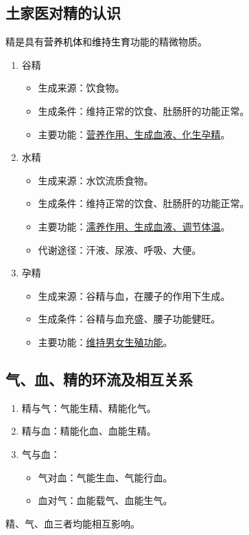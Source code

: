 \documentclass[cn,black,12pt,normal,founder]{elegantnote}
\newcommand{\redt}[1]{\textcolor{black}{{}#1}}      %
\begin{document}
\subsection{土家医对精的认识}

精是具有\redt{营养机体}和\redt{维持生育}功能的精微物质。

\begin{enumerate}
  \item 谷精
  \begin{itemize}
    \item 生成来源：饮食物。
    \item 生成条件：维持正常的饮食、肚肠肝的功能正常。
    \item 主要功能：\uline{营养作用、生成血液、化生孕精}。
  \end{itemize}
  \item 水精
  \begin{itemize}
    \item 生成来源：水饮流质食物。
    \item 生成条件：维持正常的饮食、肚肠肝的功能正常。
    \item 主要功能：\uline{濡养作用、生成血液、调节体温}。
    \item 代谢途径：汗液、尿液、呼吸、大便。
  \end{itemize}
  \item 孕精
  \begin{itemize}
    \item 生成来源：谷精与血，在腰子的作用下生成。
    \item 生成条件：谷精与血充盛、腰子功能健旺。
    \item 主要功能：\uline{维持男女生殖功能}。
  \end{itemize}
\end{enumerate}

\subsection{气、血、精的环流及相互关系}

\begin{enumerate}
  \item 精与气：气能生精、精能化气。
  \item 精与血：精能化血、血能生精。
  \item 气与血：
  \begin{itemize}
    \item 气对血：气能生血、气能行血。
    \item 血对气：血能载气、血能生气。
  \end{itemize}
\end{enumerate}
\begin{note}
  精、气、血三者均能相互影响。
\end{note}
\end{document}
